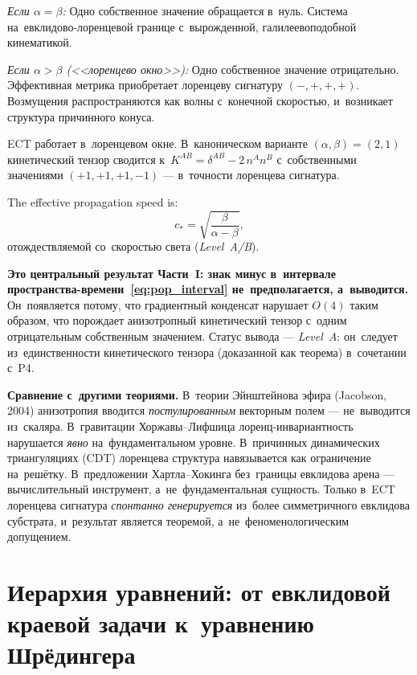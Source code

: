 \documentclass[11pt,a4paper]{article}
\begin{document}
\emph{Если $\alpha = \beta$:} Одно собственное значение обращается в~нуль. Система на~евклидово-лоренцевой границе с~вырожденной, галилеевоподобной кинематикой.

\emph{Если $\alpha > \beta$ (<<лоренцево окно>>):} Одно собственное значение отрицательно. Эффективная метрика приобретает лоренцеву сигнатуру $(-,+,+,+)$. Возмущения распространяются как волны с~конечной скоростью, и~возникает структура причинного конуса.

ECT работает в~лоренцевом окне. В~каноническом варианте $(\alpha, \beta) = (2, 1)$ кинетический тензор сводится к~$K^{AB} = \delta^{AB} - 2\,n^An^B$ с~собственными значениями $(+1, +1, +1, -1)$ --- в~точности лоренцева сигнатура.

The effective propagation speed is:
\begin{equation}
  c_* = \sqrt{\frac{\beta}{\alpha - \beta}},
  \label{eq:pop_cstar}
\end{equation}
отождествляемой со~скоростью света (\emph{Level~A/B}).

\textbf{Это центральный результат Части~I: знак минус в~интервале пространства-времени~\eqref{eq:pop_interval} не~предполагается, а~выводится.} Он~появляется потому, что градиентный конденсат нарушает $O(4)$ таким образом, что порождает анизотропный кинетический тензор с~одним отрицательным собственным значением. Статус вывода --- \emph{Level~A}: он~следует из~единственности кинетического тензора (доказанной как теорема) в~сочетании с~P4.

\textbf{Сравнение с~другими теориями.} В~теории Эйнштейнова эфира (Jacobson, 2004) анизотропия вводится \emph{постулированным} векторным полем --- не~выводится из~скаляра. В~гравитации Хоржавы--Лифшица лоренц-инвариантность нарушается \emph{явно} на~фундаментальном уровне. В~причинных динамических триангуляциях (CDT) лоренцева структура навязывается как ограничение на~решётку. В~предложении Хартла--Хокинга без~границы евклидова арена --- вычислительный инструмент, а~не~фундаментальная сущность. Только в~ECT лоренцева сигнатура \emph{спонтанно генерируется} из~более симметричного евклидова субстрата, и~результат является теоремой, а~не~феноменологическим допущением.

\FloatBarrier

\section{Иерархия уравнений: от евклидовой краевой задачи к~уравнению Шрёдингера}
\label{sec:pop_hierarchy}
\end{document}
